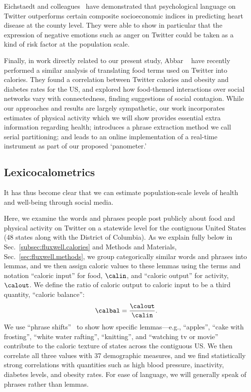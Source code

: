 Eichstaedt and colleagues~\cite{eichstaedt2015a} have demonstrated
that psychological language on Twitter outperforms certain composite 
socioeconomic indices in predicting heart disease at the county level.
They were able to show in particular that the expression
of negative emotions such as
anger on Twitter could be taken as a kind of risk factor at
the population scale.

Finally, in work directly related to our present study,
Abbar \etal~\cite{abbar2014a} have recently
performed a similar analysis 
of translating food terms used on Twitter into calories.
They found a correlation between
Twitter calories and obesity and diabetes rates for the US,
and explored how food-themed interactions over social networks vary
with connectedness, finding suggestions of social contagion.
While our approaches and results are largely sympathetic,
our work incorporates estimates of physical activity which we
will show provides essential extra information regarding health;
introduces a phrase extraction method we call serial partitioning;
and leads to an online
implementation of a real-time instrument as part of our
proposed `panometer.'

\subsection*{Lexicocalometrics}
\label{subsec:fluxwell.now}

It has thus become clear that we can estimate
population-scale levels of health and well-being through social media.

Here, we examine the words and phrases people post publicly about food and physical
activity on Twitter on a statewide level for the contiguous United
States (48 states along with the District of Columbia).
As we explain fully below
in Sec.~\ref{subsec:fluxwell.calories} 
and Methods and Materials, Sec.~\ref{sec:fluxwell.methods}, 
we group categorically similar words and phrases into lemmas,
and we then assign caloric values to these lemmas
using the terms and notation ``caloric input'' for food, $\calin$,
and ``caloric output'' for activity, $\calout$.
We define the ratio of caloric output to caloric input
to be a third quantity, ``caloric balance'':
\begin{equation}
  \calbal 
  = 
  \frac{\calout}{\calin}.
  \label{eq:fluxwell.calbal}
\end{equation}
We use ``phrase shifts''~\cite{dodds2011e} to show how 
specific
lemmas---e.g., ``apples'',
``cake with frosting'', 
``white water rafting'',
``knitting'',
and ``watching tv or movie''
contribute to the caloric texture of states across the contiguous US.
We then correlate all three values with 37
demographic measures, 
and we find statistically
strong correlations with quantities such as high blood pressure, inactivity,
diabetes levels, and obesity rates.
For ease of language, we will generally speak of 
phrases rather than lemmas.

